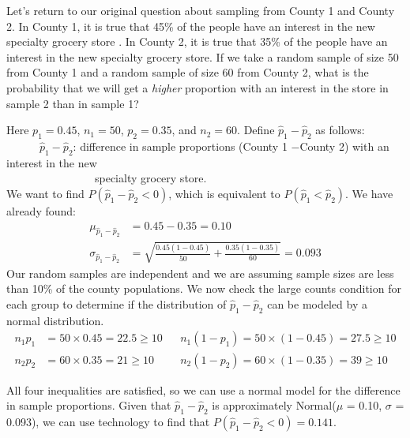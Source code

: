 \begin{examplewrap}
\label{diffpropsex}
\begin{nexample}{
  Let's return to our original question about sampling from County 1 and County 2.   In County 1, it is true that 45\% of the people have an interest in the new specialty grocery store .  In County 2, it is true that 35\% of the people have an interest in the new specialty grocery store.  If we take a random sample of size 50 from County 1 and a random sample of size 60 from County 2, what is the probability that we will get a \emph{higher} proportion with an interest in the store in sample 2 than in sample 1?}

Here $p_1 = 0.45$, $n_1=50$, $p_2=0.35$, and $n_2=60$.  Define $\hat{p}_1 - \hat{p}_2$ as follows:\\

\ \ \ \ \ \  $\hat{p}_1 - \hat{p}_2$:  difference in sample proportions (County 1 $-$County 2) with an interest in the new \\
\vspace{-3mm}
 \ \ \ \ \ \ \ \ \ \ \ \ \ \ \ \ specialty grocery store.  \\

We want to find $P(\hat{p}_1-\hat{p}_2<0)$, which is equivalent to $P(\hat{p}_1<\hat{p}_2)$.  We have already found:  
\begin{align*}
\mu_{\hat{p}_1-\hat{p}_2} &= 0.45 - 0.35 = 0.10 \\
\sigma_{\hat{p}_1-\hat{p}_2}
  &=\sqrt{\frac{0.45(1-0.45)}{50} + \frac{0.35(1-0.35)}{60}}
  = 0.093
\end{align*}
Our random samples are independent and we are assuming sample sizes are less than 10\% of the county populations.  We now check the large counts condition for each group to determine if the distribution of $\hat{p}_1-\hat{p}_2$ can be modeled by a normal distribution. 
\begin{align*}
n_1 p_1 &= 50 \times 0.45 = 22.5\ge 10 &&
    n_1 (1 - p_1) = 50 \times (1-0.45) = 27.5\ge 10\\
n_2 p_2 &= 60 \times 0.35 = 21\ge 10 &&
    n_2 (1 - p_2) = 60 \times (1-0.35) = 39\ge 10
\end{align*}


All four inequalities are satisfied, so we can use a normal model for the difference in sample proportions.  Given that $\hat{p}_1-\hat{p}_2$ is approximately Normal($\mu$ = 0.10, $\sigma$ = 0.093), we can use technology to find that \mbox{$P(\hat{p}_1-\hat{p}_2 < 0) = 0.141$.}  


\end{nexample}
\end{examplewrap}
